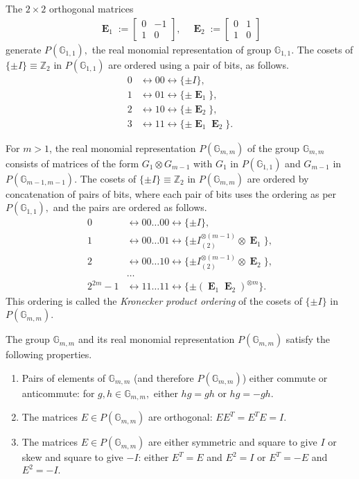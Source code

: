 \documentclass[12pt,a4paper]{article}
\newcommand{\mb}[1]{\mathbb{#1}}
\newcommand{\mf}[1]{\mathbf{#1}}
\newcommand{\oE}{\mf{\operatorname{E}}}
\newcommand{\G}{\mb{G}}
\newcommand{\Z}{\mb{Z}}
\newcommand{\Rep}{P}
\begin{document}
The $2 \times 2$ orthogonal matrices
\begin{align*}
\oE_1 :=
\left[
\begin{array}{cc}
0 & -1 \\
1 & 0
\end{array}
\right],
\quad
\oE_2 :=
\left[
\begin{array}{cc}
0 & 1 \\
1 & 0
\end{array}
\right]
\end{align*}
generate $\Rep(\G_{1,1}),$ the real monomial representation of group $\G_{1,1}.$
The cosets of $\{\pm I\} \equiv \Z_2$ in $\Rep(\G_{1,1})$ are
ordered using a pair of bits, as follows.
\begin{align*}
0 &\leftrightarrow 00 \leftrightarrow \{ \pm I \},
\\
1 &\leftrightarrow 01 \leftrightarrow \{ \pm \oE_1 \},
\\
2 &\leftrightarrow 10 \leftrightarrow \{ \pm \oE_2 \},
\\
3 &\leftrightarrow 11 \leftrightarrow \{ \pm \oE_1 \oE_2 \}.
\end{align*}

For $m > 1$,
the real monomial representation $\Rep(\G_{m,m})$ of the
group $\G_{m,m}$ consists of matrices of the form $G_1 \otimes G_{m-1}$
with $G_1$ in $\Rep(\G_{1,1})$ and $G_{m-1}$ in $\Rep(\G_{m-1,m-1}).$
The cosets of $\{\pm I\} \equiv \Z_2$ in $\Rep(\G_{m,m})$ are
ordered by concatenation of pairs of bits,
where each pair of bits uses the ordering as per $\Rep(\G_{1,1}),$
and the pairs are ordered as follows.
\begin{align*}
0 &\leftrightarrow 00 \ldots 00 \leftrightarrow \{ \pm I \},
\\
1 &\leftrightarrow 00 \ldots 01 \leftrightarrow \{ \pm I_{(2)}^{\otimes {(m-1)}} \otimes  \oE_1 \},
\\
2 &\leftrightarrow 00 \ldots 10 \leftrightarrow \{ \pm I_{(2)}^{\otimes {(m-1)}} \otimes  \oE_2 \},
\\
&\ldots
\\
2^{2m} - 1 &\leftrightarrow 11 \ldots 11 \leftrightarrow \{ \pm (\oE_1 \oE_2)^{\otimes {m}} \}.
\end{align*}
This ordering is called
the \emph{Kronecker product ordering} of the cosets of $\{\pm I\}$ in $\Rep(\G_{m,m}).$

The group $\G_{m,m}$ and its real monomial representation $\Rep(\G_{m,m})$
satisfy the following properties.
\begin{enumerate}
\item
Pairs of elements of $\G_{m,m}$ (and therefore $\Rep(\G_{m,m})$) either commute or anti\-commute:
for $g, h \in \G_{m,m},$ either $h g = g h$ or $h g = - g h.$
\item
The matrices $E \in \Rep(\G_{m,m})$ are orthogonal: $E E^T = E^T E = I.$
\item
The matrices $E \in \Rep(\G_{m,m})$ are either symmetric and square to give $I$ or
skew and square to give $-I$: either $E^T = E$ and $E^2 =I$ or $E^T = -E$ and $E^2 = -I.$
\end{enumerate}
\end{document}
